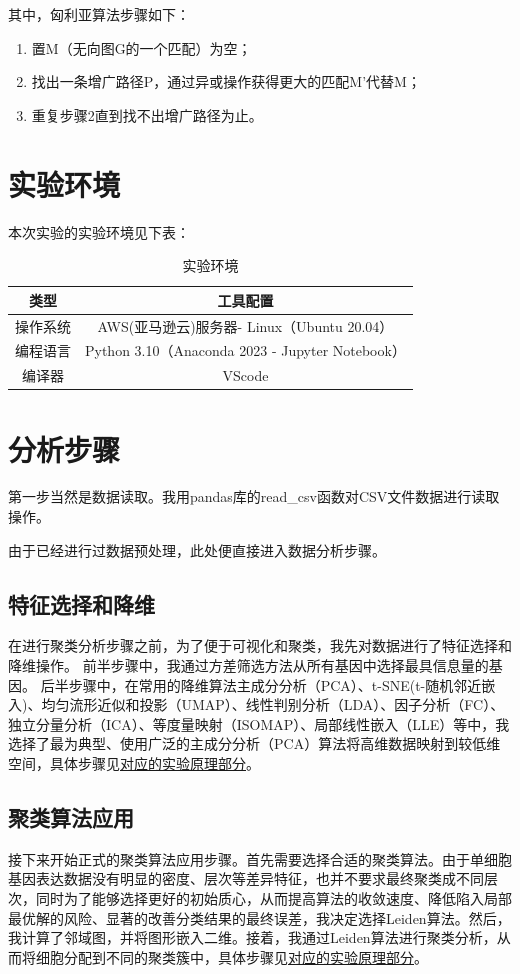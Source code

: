 \documentclass {article}
\begin{document}
	其中，匈利亚算法步骤如下：
	\begin{enumerate}
		\item 置M（无向图G的一个匹配）为空；
		\item 找出一条增广路径P，通过异或操作获得更大的匹配M'代替M；
		\item 重复步骤2直到找不出增广路径为止。
	\end{enumerate}
	
	\section{实验环境}
	本次实验的实验环境见下表：
	\begin{table}[H]
		\caption{实验环境}
		\centering
		\begin{tabular}{cc}
			\hline
			类型 & 工具配置 \\ \hline
			操作系统 & AWS(亚马逊云)服务器- Linux（Ubuntu 20.04）  \\
			编程语言 & Python 3.10（Anaconda 2023 - Jupyter Notebook） \\ 
			编译器  & VScode                                      \\ \hline
		\end{tabular}
	\end{table}
	
	\section{分析步骤}
	第一步当然是数据读取。我用pandas库的read\_csv函数对CSV文件数据进行读取操作。
	
	由于已经进行过数据预处理，此处便直接进入数据分析步骤。
	
	\subsection{特征选择和降维}
	在进行聚类分析步骤之前，为了便于可视化和聚类，我先对数据进行了特征选择和降维操作。
	前半步骤中，我通过方差筛选方法从所有基因中选择最具信息量的基因。
	后半步骤中，在常用的降维算法主成分分析（PCA）、t-SNE(t-随机邻近嵌入)、均匀流形近似和投影（UMAP）、线性判别分析（LDA）、因子分析（FC）、独立分量分析（ICA）、等度量映射（ISOMAP）、局部线性嵌入（LLE）等中，我选择了最为典型、使用广泛的主成分分析（PCA）算法将高维数据映射到较低维空间，具体步骤见\hyperref[PCA算法原理]{对应的实验原理部分}。
	
	\subsection{聚类算法应用}
	接下来开始正式的聚类算法应用步骤。首先需要选择合适的聚类算法。由于单细胞基因表达数据没有明显的密度、层次等差异特征，也并不要求最终聚类成不同层次，同时为了能够选择更好的初始质心，从而提高算法的收敛速度、降低陷入局部最优解的风险、显著的改善分类结果的最终误差，我决定选择Leiden算法。然后，我计算了邻域图，并将图形嵌入二维。接着，我通过Leiden算法进行聚类分析，从而将细胞分配到不同的聚类簇中，具体步骤见\hyperref[Leiden算法原理]{对应的实验原理部分}。
	
\end{document}
